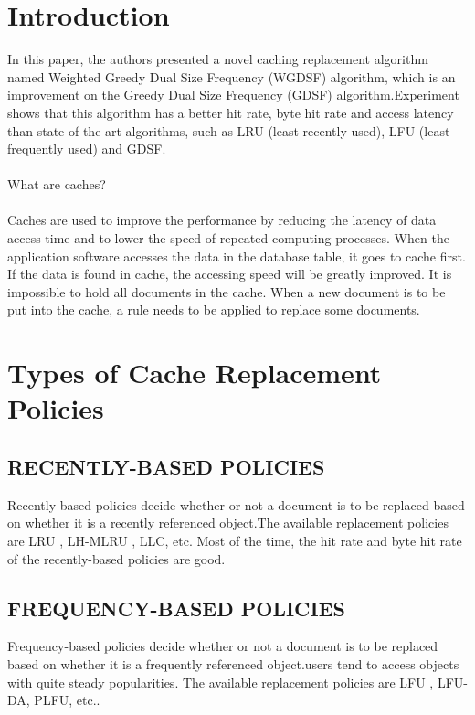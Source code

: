 \documentclass[conference]{IEEEtran}
\begin{document}
\section{Introduction}
 
In this paper, the authors presented a novel caching replacement algorithm named Weighted Greedy Dual Size Frequency (WGDSF) algorithm, which is an improvement on the Greedy Dual Size Frequency (GDSF) algorithm.Experiment shows that this algorithm has a better hit rate, byte hit rate and access latency than state-of-the-art algorithms, such as LRU (least recently used), LFU (least frequently used) and GDSF.\\
\\
What are caches?\\
\\
Caches are used to improve the performance by reducing the latency of data access time and to lower the  speed of repeated computing processes. When the application software accesses the data in the database table, it goes to cache first. If the data is found in cache, the accessing speed will be greatly improved.
It is impossible to hold all documents in the cache. When a new document is to be put into the cache, a rule needs to be applied to replace some documents.
\section{Types of Cache Replacement Policies}


\subsection{RECENTLY-BASED POLICIES}

Recently-based policies decide whether or not a document
is to be replaced based on whether it is a recently referenced
object.The available replacement policies are LRU , LH-MLRU , LLC, etc. Most of the time, the hit rate and byte hit rate of the recently-based policies are good.

\subsection{FREQUENCY-BASED POLICIES}

Frequency-based policies decide whether or not a document is to be replaced based on whether it is a frequently referenced object.users tend to
access objects with quite steady popularities. The available replacement policies are LFU , LFU-DA, PLFU, etc.. 
\end{document}
